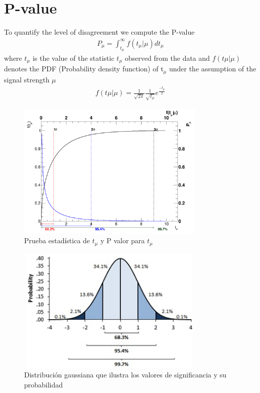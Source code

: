 \chapter{P-value}
To quantify the level of disagreement we compute the P-value
\begin{align}
	P_\mu =\int_{t_\mu}^{\infty}f(t_\mu |\mu) dt_\mu
\end{align}
where $t_\mu$  is the value of the statistic $t_\mu$ observed from the data and $f(t\mu |\mu)$ denotes
the PDF (Probability density function) of t$_\mu$ under the assumption of the signal strength $\mu$
\begin{align}
	f(t\mu |\mu)=\frac{1}{\sqrt{2\pi}} \frac{1}{\sqrt{t_\mu}}e^\frac{-t_\mu}{2}
\end{align}


\begin{figure}
	\centering
	\includegraphics[width=9cm,height=6	cm]{Chapter3/nos.png}
	\caption{Prueba estad\'istica de $t_\mu$ y P valor para $t_\mu$}
\end{figure}


\begin{figure}
	\centering
	\includegraphics[width=9cm,height=6cm]{Chapter3/normal-curve.jpg}
	\caption{Distribuci\'on gaussiana que ilustra los valores de significancia y su probabilidad}
\end{figure}